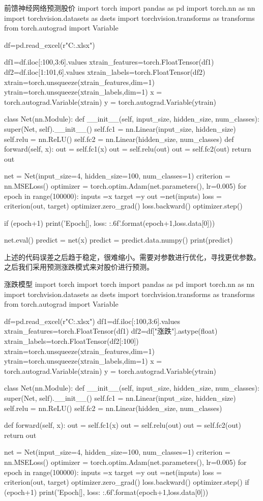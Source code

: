 \documentclass[openbib]{article}
\begin{document}
\begin{Python}{前馈神经网络预测股价}
import torch
import pandas as pd
import torch.nn as nn
import torchvision.datasets as dsets
import torchvision.transforms as transforms
from torch.autograd import Variable

df=pd.read_excel(r"C:\Users\yjb\Desktop\stock.xlsx")

df1=df.iloc[:100,3:6].values
xtrain_features=torch.FloatTensor(df1)
df2=df.iloc[1:101,6].values
xtrain_labels=torch.FloatTensor(df2)
xtrain=torch.unsqueeze(xtrain_features,dim=1)
ytrain=torch.unsqueeze(xtrain_labels,dim=1)
x = torch.autograd.Variable(xtrain)
y = torch.autograd.Variable(ytrain)

class Net(nn.Module):
	def __init__(self, input_size, hidden_size, num_classes):
		super(Net, self).__init__()
		self.fc1 = nn.Linear(input_size, hidden_size)
		self.relu = nn.ReLU()
		self.fc2 = nn.Linear(hidden_size, num_classes)
	def forward(self, x):
		out = self.fc1(x)
		out = self.relu(out)
		out = self.fc2(out)
		return out
		
net = Net(input_size=4, hidden_size=100, num_classes=1)
criterion = nn.MSELoss()
optimizer = torch.optim.Adam(net.parameters(), lr=0.005)
for epoch in range(100000):
	inputs =x
	target =y
	out =net(inputs)
	loss = criterion(out, target)
	optimizer.zero_grad()
	loss.backward()
	optimizer.step()

if (epoch+1) %
	print('Epoch[{}], loss: {:.6f}'.format(epoch+1,loss.data[0]))

net.eval()
predict = net(x)
predict = predict.data.numpy()
print(predict)
\end{Python}

上述的代码误差之后趋于稳定，很难缩小。需要对参数进行优化，寻找更优参数。之后我们采用预测涨跌模式来对股价进行预测。
\begin{Python}{涨跌模型}
import torch
import torch
import pandas as pd
import torch.nn as nn
import torchvision.datasets as dsets
import torchvision.transforms as transforms
from torch.autograd import Variable

df=pd.read_excel(r"C:\Users\yjb\Desktop\stock.xlsx")
df1=df.iloc[:100,3:6].values
xtrain_features=torch.FloatTensor(df1)
df2=df["涨跌"].astype(float)
xtrain_labels=torch.FloatTensor(df2[:100])
xtrain=torch.unsqueeze(xtrain_features,dim=1)
ytrain=torch.unsqueeze(xtrain_labels,dim=1)
x = torch.autograd.Variable(xtrain)
y = torch.autograd.Variable(ytrain)

class Net(nn.Module):
	def __init__(self, input_size, hidden_size, num_classes):
		super(Net, self).__init__()
		self.fc1 = nn.Linear(input_size, hidden_size)
		self.relu = nn.ReLU()
		self.fc2 = nn.Linear(hidden_size, num_classes)

	def forward(self, x):
		out = self.fc1(x)
		out = self.relu(out)
		out = self.fc2(out)
		return out
		
net = Net(input_size=4, hidden_size=100, num_classes=1)
criterion = nn.MSELoss()
optimizer = torch.optim.Adam(net.parameters(), lr=0.005)
for epoch in range(100000):
	inputs =x
	target =y
	out =net(inputs)
	loss = criterion(out, target)
	optimizer.zero_grad()
	loss.backward()
	optimizer.step()
	if (epoch+1) %
		print('Epoch[{}], loss: {:.6f}'.format(epoch+1,loss.data[0]))
\end{Python}
\end{document}
